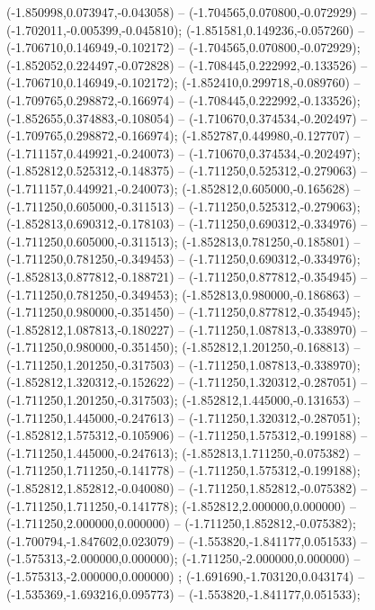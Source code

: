  (-1.850998,0.073947,-0.043058) -- (-1.704565,0.070800,-0.072929) -- (-1.702011,-0.005399,-0.045810);
 (-1.851581,0.149236,-0.057260) -- (-1.706710,0.146949,-0.102172) -- (-1.704565,0.070800,-0.072929);
 (-1.852052,0.224497,-0.072828) -- (-1.708445,0.222992,-0.133526) -- (-1.706710,0.146949,-0.102172);
 (-1.852410,0.299718,-0.089760) -- (-1.709765,0.298872,-0.166974) -- (-1.708445,0.222992,-0.133526);
 (-1.852655,0.374883,-0.108054) -- (-1.710670,0.374534,-0.202497) -- (-1.709765,0.298872,-0.166974);
 (-1.852787,0.449980,-0.127707) -- (-1.711157,0.449921,-0.240073) -- (-1.710670,0.374534,-0.202497);
 (-1.852812,0.525312,-0.148375) -- (-1.711250,0.525312,-0.279063) -- (-1.711157,0.449921,-0.240073);
 (-1.852812,0.605000,-0.165628) -- (-1.711250,0.605000,-0.311513) -- (-1.711250,0.525312,-0.279063);
 (-1.852813,0.690312,-0.178103) -- (-1.711250,0.690312,-0.334976) -- (-1.711250,0.605000,-0.311513);
 (-1.852813,0.781250,-0.185801) -- (-1.711250,0.781250,-0.349453) -- (-1.711250,0.690312,-0.334976);
 (-1.852813,0.877812,-0.188721) -- (-1.711250,0.877812,-0.354945) -- (-1.711250,0.781250,-0.349453);
 (-1.852813,0.980000,-0.186863) -- (-1.711250,0.980000,-0.351450) -- (-1.711250,0.877812,-0.354945);
 (-1.852812,1.087813,-0.180227) -- (-1.711250,1.087813,-0.338970) -- (-1.711250,0.980000,-0.351450);
 (-1.852812,1.201250,-0.168813) -- (-1.711250,1.201250,-0.317503) -- (-1.711250,1.087813,-0.338970);
 (-1.852812,1.320312,-0.152622) -- (-1.711250,1.320312,-0.287051) -- (-1.711250,1.201250,-0.317503);
 (-1.852812,1.445000,-0.131653) -- (-1.711250,1.445000,-0.247613) -- (-1.711250,1.320312,-0.287051);
 (-1.852812,1.575312,-0.105906) -- (-1.711250,1.575312,-0.199188) -- (-1.711250,1.445000,-0.247613);
 (-1.852813,1.711250,-0.075382) -- (-1.711250,1.711250,-0.141778) -- (-1.711250,1.575312,-0.199188);
 (-1.852812,1.852812,-0.040080) -- (-1.711250,1.852812,-0.075382) -- (-1.711250,1.711250,-0.141778);
 (-1.852812,2.000000,0.000000) -- (-1.711250,2.000000,0.000000) -- (-1.711250,1.852812,-0.075382);
 (-1.700794,-1.847602,0.023079) -- (-1.553820,-1.841177,0.051533) -- (-1.575313,-2.000000,0.000000);
 (-1.711250,-2.000000,0.000000) -- (-1.575313,-2.000000,0.000000) ;
 (-1.691690,-1.703120,0.043174) -- (-1.535369,-1.693216,0.095773) -- (-1.553820,-1.841177,0.051533);

